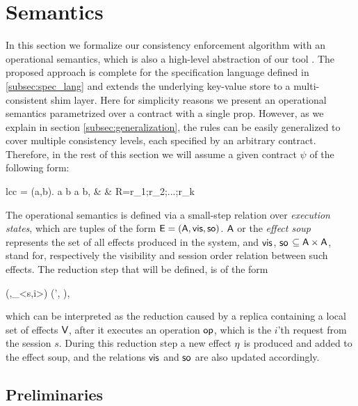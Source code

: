 %
%
\section{Semantics}
In this section we formalize our consistency enforcement algorithm with an
operational semantics, which is also a high-level abstraction of our
tool \tool.
The proposed approach is complete for the specification language defined
in \ref{subsec:spec_lang}
and extends the underlying key-value store to a multi-consistent shim
layer. Here for simplicity reasons we present an operational semantics 
parametrized over a contract with a single prop. However, as we explain
in section \ref{subsec:generalization}, the rules can be easily
generalized to cover multiple consistency levels, each specified by an
arbitrary contract. Therefore, in the rest of this section we will assume a given contract $\psi$ of the
following form:
	\begin{smathpar}
	\begin{array}{lcc}
		\psi = \forall (a,b). a  b  \Rightarrow a
		 b, & \spc & R=r_1;r_2;...;r_k \\
	\end{array}
	\end{smathpar}

The operational semantics is defined via a small-step relation over \emph{execution
states}, which are tuples of the form ${\normalfont \textsf{E}}=({\normalfont \textsf{A}},{\normalfont \textsf{vis}} ,{\normalfont \textsf{so}})$.
${\normalfont \textsf{A}}$ or the \emph{effect soup} represents the set of all
effects produced in the system, and  ${\normalfont \textsf{vis}}$,
${\normalfont \textsf{so}}$ $\subseteq {\normalfont \textsf{A}} \times {\normalfont \textsf{A}}$, stand for, respectively the visibility and session order relation
between such effects. The reduction step that will be defined, is of the form
\begin{smathpar}
(\E,\op_{<s,i>}) \;\xrightarrow{\V}\; (\E', \eff),
\end{smathpar}
which can be interpreted as the reduction caused by a replica containing a local 
set of effects ${\normalfont \textsf{V}}$, after it executes an operation
${\normalfont \textsf{op}}$, which is the $i$'th request from the session $s$. 
During this reduction step a new effect $\eta$ is produced and added to
the effect soup, and the relations ${\normalfont \textsf{vis}}$ and ${\normalfont \textsf{so}}$ are also updated
accordingly.


\subsection{Preliminaries}



